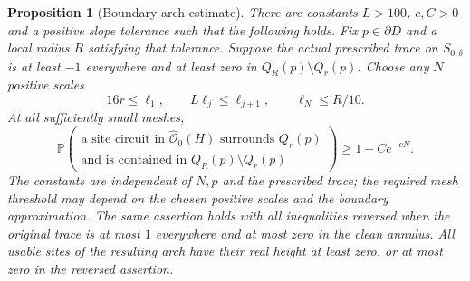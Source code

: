\documentclass[11pt]{article}
\newtheorem{proposition}[theorem]{Proposition}
\theoremstyle{definition}
\theoremstyle{remark}
\numberwithin{equation}{section}
\begin{document}
\begin{samepage}
\begin{proposition}[Boundary arch estimate]\label{prop:boundary-arch}
There are constants $L>100$, $c,C>0$ and a positive slope tolerance
such that the following holds.  Fix $p\in\partial D$ and a local
radius $R$ satisfying that tolerance.  Suppose the actual prescribed
trace on $S_{0,\delta}$ is at least $-1$ everywhere and at least zero
in $Q_R(p)\setminus Q_r(p)$.  Choose any $N$ positive scales
\[
 16r\le\ell_1,\qquad
 L\ell_j\le\ell_{j+1},\qquad
 \ell_N\le R/10.
\]
At all sufficiently small meshes,
\begin{equation}
 \mathbb P\!\left(
 \begin{array}{c}
 \text{a site circuit in }\widehat{\mathcal O}_0(H)
 \text{ surrounds }Q_r(p)\\[-2pt]
 \text{and is contained in }Q_R(p)\setminus Q_r(p)
 \end{array}\right)
 \ge 1-Ce^{-cN}.
 \label{boundary:arch-estimate}
\end{equation}
The constants are independent of $N,p$ and the prescribed trace;
the required mesh threshold may depend on the chosen positive
scales and the boundary approximation.  The same assertion holds
with all inequalities reversed when the original trace is at most
$1$ everywhere and at most zero in the clean annulus.  All usable
sites of the resulting arch have their real height at least zero,
or at most zero in the reversed assertion.
\end{proposition}
\end{samepage}
\end{document}
